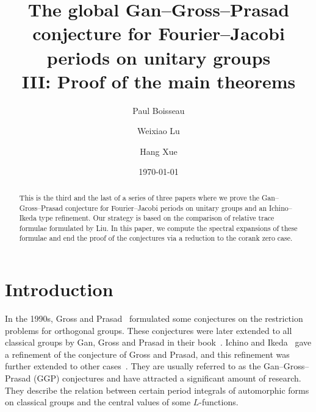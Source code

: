 \documentclass[letterpaper,11pt]{amsart}
\newcommand{\<}{\negthickspace}
\theoremstyle{definition}
\theoremstyle{plain}
\theoremstyle{remark}
\numberwithin{equation}{section}
\begin{document}
\title{The global Gan--Gross--Prasad conjecture for Fourier--Jacobi periods on unitary groups \\ III: Proof of the main theorems}

\author{Paul Boisseau}

\author{Weixiao Lu}

\author{Hang Xue}



\address{Paul Boisseau, Max Planck Institute for Mathematics, Vivatsgasse 7, 53111 Bonn, Germany}


\address{Weixiao Lu, Aix Marseille Univ, CNRS, I2M, Marseille, 13009, France}


\address{Hang Xue, Department of Mathematics, The University of Arizona, Tucson, AZ, 85721, USA}


\date{\today}

\begin{abstract} 
This is the third and the last of a series of three papers where we prove the Gan--Gross--Prasad conjecture for Fourier--Jacobi periods on unitary groups and an Ichino--Ikeda type refinement. Our strategy is based on the comparison of relative trace formulae formulated by Liu. In this paper, we compute the spectral expansions of these formulae and end the proof of the conjectures via a reduction to the corank zero case.
\end{abstract}

\setcounter{tocdepth}{1}


\maketitle

\tableofcontents

\section{Introduction}


In the 1990s, Gross and Prasad~\cites{GP1,GP2} formulated some conjectures on the
restriction problems for orthogonal groups. These conjectures were later
extended to all classical groups by Gan, Gross and Prasad in their
book~\cite{GGP}. Ichino and Ikeda~\cite{II} gave a refinement of the
conjecture of Gross and Prasad, and this refinement was further extended to
other cases~\cites{NHarris,Liu2,Xue2,Xue7}. They are usually
referred to as the Gan--Gross--Prasad (GGP) conjectures and have attracted
a significant amount of research. They describe the relation
between certain period integrals of automorphic forms on classical groups and
the central values of some $L$-functions. 
\end{document}
